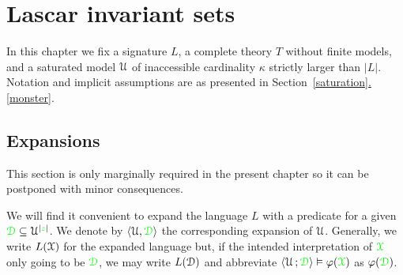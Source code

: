 \documentclass[creche.tex]{subfiles}
\begin{document}
\chapter{Lascar invariant sets}
\label{invariantL}


\def\medrel#1{\parbox[t]{6ex}{$\displaystyle\hfil #1$}}
\def\ceq#1#2#3{\parbox[t]{18ex}{$\displaystyle #1$}\medrel{#2}{$\displaystyle #3$}}

\def\mr{\color{brown}}
\def\gr{\color{green}}


In this chapter we fix a signature $L$, a complete theory $T$ without finite models, and a saturated model $\EuScript U$ of inaccessible cardinality $\kappa$ strictly larger than $|L|$. Notation and implicit assumptions are as presented in Section~\hyperref[saturation]{\ref*{saturation}.\ref*{monster}}.


\section{Expansions}
\label{expansions}

\def\ceq#1#2#3{\parbox[t]{16ex}{$\displaystyle #1$}\medrel{#2}{$\displaystyle #3$}}

This section is only marginally required in the present chapter so it can be postponed with minor consequences.

We will find it convenient to expand the language $L$ with a predicate for a given $\grD\subseteq\U^{|{\gr z}|}$. We denote by $\<\U,\grD\>$ the corresponding expansion of $\EuScript U$. Generally, we write \emph{$L(\EuScript X)$} for the expanded language but, if the intended interpretation of ${\gr\X}$ only going to be $\grD$, we may write \emph{$L(\EuScript D)$} and abbreviate $\<\U\,;\grD\>\models\phi({\gr\X})$ as $\phi(\grD)$. 


\end{document}
